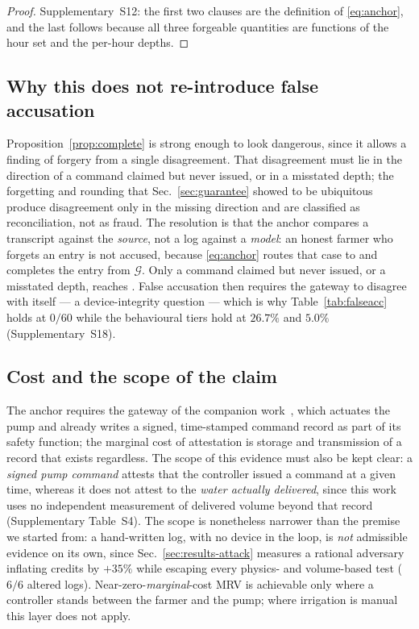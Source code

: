 \begin{proof}
Supplementary~S12: the first two clauses are the definition of \eqref{eq:anchor},
and the last follows because all three forgeable quantities are functions of
the hour set and the per-hour depths.
\end{proof}

\subsection{Why this does not re-introduce false accusation}

Proposition~\ref{prop:complete} is strong enough to look dangerous, since it allows a
finding of forgery from a single disagreement. That disagreement must lie in the
direction of a command claimed but never issued, or in a misstated depth; the
forgetting and rounding that Sec.~\ref{sec:guarantee} showed to be ubiquitous
produce disagreement only in the missing direction and are classified as
reconciliation, not as fraud. The resolution is that the
anchor compares a transcript against the \emph{source}, not a log against a
\emph{model}: an honest farmer who forgets an entry is not accused, because
\eqref{eq:anchor} routes that case to  and completes the entry from
$\mathcal{G}$. Only a command claimed but never issued, or a misstated depth,
reaches . False accusation then requires the gateway to disagree with
itself --- a device-integrity question --- which is why Table~\ref{tab:falseacc}
holds at $0/60$ while the behavioural tiers hold at $26.7\%$ and $5.0\%$
(Supplementary~S18).

\subsection{Cost and the scope of the claim}

The anchor requires the gateway of the companion work~\cite{twingate2026},
which actuates the pump and already writes a signed, time-stamped command
record as part of its safety function; the marginal cost of attestation is
storage and transmission of a record that exists regardless. The scope of this
evidence must also be kept clear: a \emph{signed pump command} attests that the
controller issued a command at a given time, whereas it does not attest to the
\emph{water actually delivered}, since this work uses no independent measurement of
delivered volume beyond that record (Supplementary Table~S4). The scope is
nonetheless narrower than the premise we started from: a hand-written log, with
no device in the loop, is \emph{not} admissible evidence on its own, since
Sec.~\ref{sec:results-attack} measures a rational adversary inflating credits by
$+35\%$ while escaping every physics- and volume-based test ($6/6$ altered
logs). Near-zero-\emph{marginal}-cost MRV is achievable only where a controller stands
between
the farmer and the pump; where irrigation is manual this layer does not
apply.
